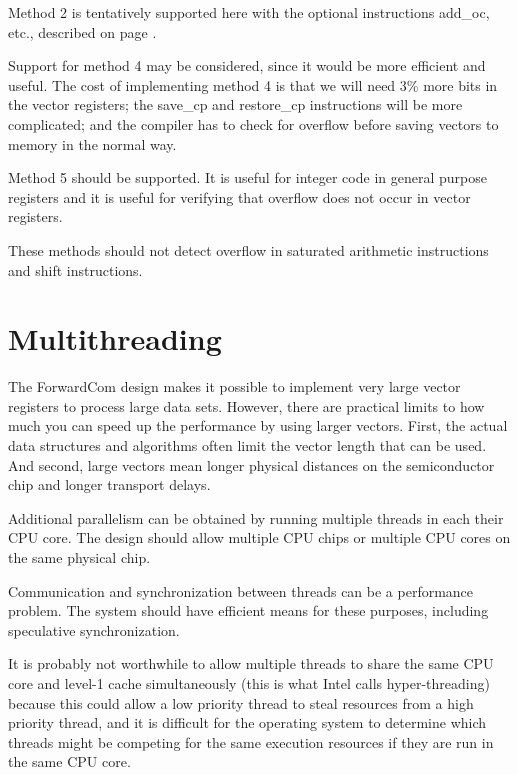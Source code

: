\documentclass[forwardcom.tex]{subfiles}
\begin{document}
Method 2 is tentatively supported here with the optional instructions add\_oc, etc., described on page \pageref{instructionsWithOverflowCheck}. 
\vspace{2mm}

Support for method 4 may be considered, since it would be more efficient and useful. The cost of implementing method 4 is that we will need 3\% more bits in the vector registers; the save\_cp and restore\_cp instructions will be more complicated; and the compiler has to check for overflow before saving vectors to memory in the normal way. 
\vspace{2mm}

Method 5 should be supported. It is useful for integer code in general purpose registers and it is useful for verifying that overflow does not occur in vector registers.
\vspace{2mm}

These methods should not detect overflow in saturated arithmetic instructions and shift instructions.

\section{Multithreading}
The ForwardCom design makes it possible to implement very large vector registers to process large data sets. However, there are practical limits to how much you can speed up the performance by using larger vectors. First, the actual data structures and algorithms often limit the vector length that can be used. And second, large vectors mean longer physical distances on the semiconductor chip and longer transport delays.
\vspace{2mm}

Additional parallelism can be obtained by running multiple threads in each their CPU core. The design should allow multiple CPU chips or multiple CPU cores on the same physical chip.
\vspace{2mm}

Communication and synchronization between threads can be a performance problem. The system should have efficient means for these purposes, including speculative synchronization.
\vspace{2mm}

It is probably not worthwhile to allow multiple threads to share the same CPU core and level-1 cache simultaneously (this is what Intel calls hyper-threading) because this could allow a low priority thread to steal resources from a high priority thread, and it is difficult for the operating system to determine which threads might be competing for the same execution resources if they are run in the same CPU core.
\vspace{2mm}
\end{document}
